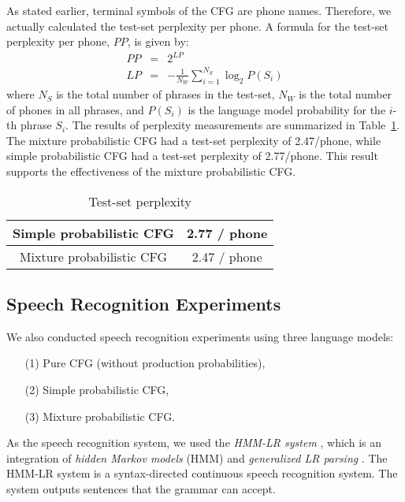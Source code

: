 As stated earlier,
terminal symbols of the CFG are phone names.
Therefore, we actually calculated the test-set perplexity per phone.
A formula for the test-set perplexity per phone, $PP$, is given by:
\begin{eqnarray}
	PP & = & 2^{LP} \\
	LP & = & -\frac{1}{N_{W}} \sum_{i=1}^{N_{S}} \log_{2} P(S_{i})
\end{eqnarray}
where $N_{S}$ is the total number of phrases in the test-set,
$N_{W}$ is the total number of phones in all phrases,
and $P(S_{i})$ is the language model probability for the $i$-th phrase $S_{i}$.
The results of perplexity measurements are summarized in Table~\ref{Tab:Perplexity}.
The mixture probabilistic CFG had a test-set perplexity of 2.47/phone,
while simple probabilistic CFG had a test-set perplexity of 2.77/phone.
This result
supports the effectiveness of the mixture probabilistic CFG.

\begin{table}[h]
\caption{Test-set perplexity} \label{Tab:Perplexity}
\begin{center}
\begin{tabular}{c|c}
\hline
Simple probabilistic CFG	& 2.77 / phone \\ \hline
Mixture probabilistic CFG	& 2.47 / phone \\ \hline
\end{tabular}
\end{center}
\end{table}


\subsection{Speech Recognition Experiments}

We also conducted speech recognition experiments
using three language models:
\begin{itemize}
\item[(1)]	Pure CFG (without production probabilities),
\item[(2)]	Simple probabilistic CFG,
\item[(3)]	Mixture probabilistic CFG.
\end{itemize}
As the speech recognition system,
we used the {\em HMM-LR system} \cite{Kita89,Hanazawa90},
which is an integration of {\em hidden Markov models} (HMM) \cite{Huang90}
and {\em generalized LR parsing} \cite{Tomita91}.
The HMM-LR system is a syntax-directed continuous speech recognition system.
The system outputs sentences that the grammar can accept.

